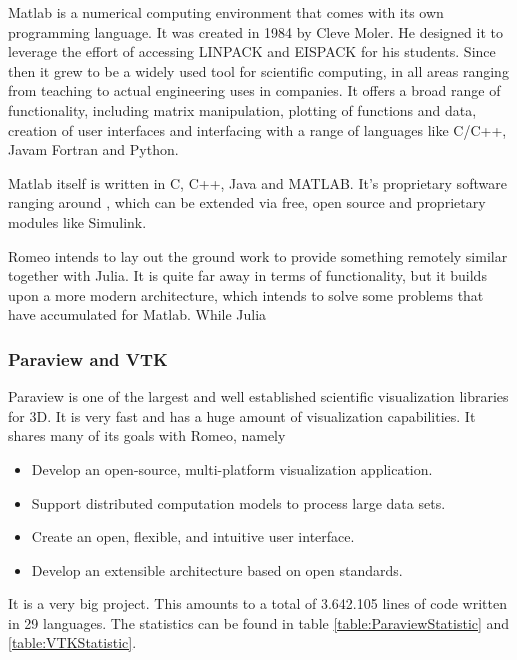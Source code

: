 \ac{Matlab} is a numerical computing environment that comes with its own programming language.
It was created in 1984 by Cleve Moler. He designed it to leverage the effort of accessing LINPACK and EISPACK for his students.
Since then it grew to be a widely used tool for scientific computing, in all areas ranging from teaching to actual engineering uses in companies.
It offers a broad range of functionality, including matrix manipulation, plotting of functions and data, creation of user interfaces and interfacing with a range of languages like C/C++, Javam Fortran and Python.

\ac{Matlab} itself is written in C, C++, Java and MATLAB.
It's proprietary software ranging around  \cite{MatlabPricing}, which can be extended via free, open source and proprietary modules like Simulink.

Romeo intends to lay out the ground work to provide something remotely similar together with Julia. It is quite far away in terms of functionality, but it builds upon a more modern architecture, which intends to solve some problems that have accumulated for Matlab.
While Julia 

\subsubsection{Paraview and VTK}


Paraview is one of the largest and well established scientific visualization libraries for 3D.
It is very fast and has a huge amount of visualization capabilities. It shares many of its goals with Romeo, namely \cite{Paraview}
\begin{itemize}
	\item Develop an open-source, multi-platform visualization application.
	\item Support distributed computation models to process large data sets.
	\item Create an open, flexible, and intuitive user interface.
	\item Develop an extensible architecture based on open standards.
\end{itemize}
It is a very big project.
This amounts to a total of 3.642.105 lines of code written in 29 languages. The statistics can be found in table \ref{table:ParaviewStatistic} and \ref{table:VTKStatistic}.
